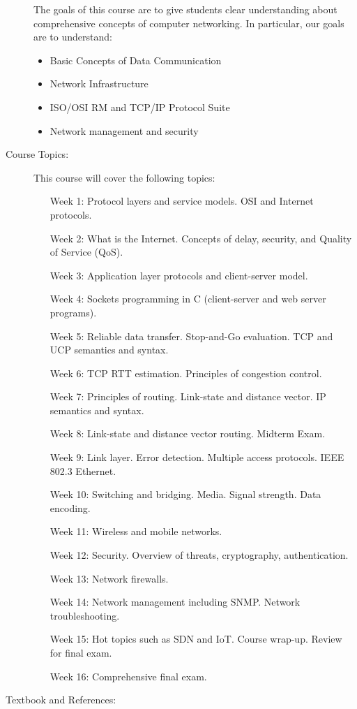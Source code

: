 \documentclass{wx672article} %
\begin{document}
\begin{description}
  The goals of this course are to give students clear understanding about comprehensive
  concepts of computer networking. In particular, our goals are to understand:
  \begin{itemize}
  \item Basic Concepts of Data Communication
  \item Network Infrastructure
  \item ISO/OSI RM and TCP/IP Protocol Suite
  \item Network management and security
  \end{itemize}
\item[Course Topics:] This course will cover the following topics:
  \begin{itemize}
  \item[Week 1:] Protocol layers and service models. OSI and Internet protocols.
  \item[Week 2:] What is the Internet. Concepts of delay, security, and Quality of Service
    (QoS).       
  \item[Week 3:] Application layer protocols and client-server model.
  \item[Week 4:] Sockets programming in C (client-server and web server programs).
  \item[Week 5:] Reliable data transfer. Stop-and-Go evaluation. TCP and UCP semantics and
    syntax.      
  \item[Week 6:] TCP RTT estimation. Principles of congestion control.
  \item[Week 7:] Principles of routing. Link-state and distance vector. IP semantics and
    syntax.      
  \item[Week 8:] Link-state and distance vector routing. Midterm Exam.
  \item[Week 9:] Link layer. Error detection. Multiple access protocols. IEEE 802.3
    Ethernet.
  \item[Week 10:] Switching and bridging. Media. Signal strength. Data encoding.
  \item[Week 11:] Wireless and mobile networks.
  \item[Week 12:] Security. Overview of threats, cryptography, authentication.
  \item[Week 13:] Network firewalls.
  \item[Week 14:] Network management including SNMP. Network troubleshooting.
  \item[Week 15:] Hot topics such as SDN and IoT. Course wrap-up. Review for final exam.
  \item[Week 16:] Comprehensive final exam.
  \end{itemize}
\item[Textbook and References:]\hfill
  \nocite{tanenbaum2011computer,fall2011tcp,kurose2013computer,bautts2005linux,hunt2002tcp,hall2009beej}
  \printbibliography[heading=none]{}
\end{description}
\end{document}
